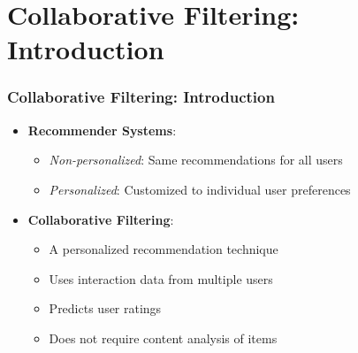 \documentclass{beamer}
\begin{document}
\section{Collaborative Filtering: Introduction}
\begin{frame}
\frametitle{Collaborative Filtering: Introduction}
\begin{itemize}
    \item \textbf{Recommender Systems}:
    \begin{itemize}
        \item \textit{Non-personalized}: Same recommendations for all users
        \item \textit{Personalized}: Customized to individual user preferences
    \end{itemize}
    \vspace{0.3cm}
    
    \item \textbf{Collaborative Filtering}:
    \begin{itemize}
        \item A personalized recommendation technique
        \item Uses interaction data from multiple users
        \item Predicts user ratings
        \item Does not require content analysis of items
    \end{itemize}
\end{itemize}
\end{frame}
\end{document}
